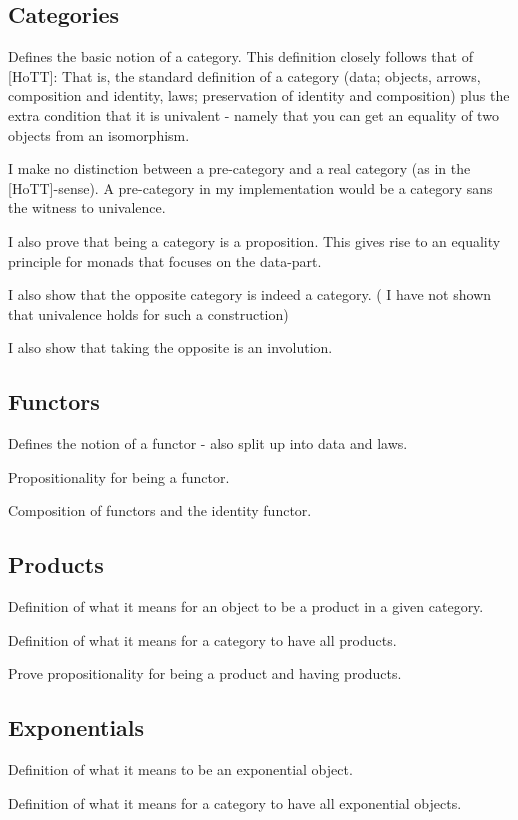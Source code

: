 \subsection{Categories}
Defines the basic notion of a category. This definition closely follows that of
[HoTT]: That is, the standard definition of a category (data; objects, arrows,
composition and identity, laws; preservation of identity and composition) plus
the extra condition that it is univalent - namely that you can get an equality
of two objects from an isomorphism.

I make no distinction between a pre-category and a real category (as in the
[HoTT]-sense). A pre-category in my implementation would be a category sans the
witness to univalence.

I also prove that being a category is a proposition. This gives rise to an
equality principle for monads that focuses on the data-part.

I also show that the opposite category is indeed a category. (\WIP{} I have not
shown that univalence holds for such a construction)

I also show that taking the opposite is an involution.

\subsection{Functors}
Defines the notion of a functor - also split up into data and laws.

Propositionality for being a functor.

Composition of functors and the identity functor.

\subsection{Products}
Definition of what it means for an object to be a product in a given category.

Definition of what it means for a category to have all products.

\WIP{} Prove propositionality for being a product and having products.

\subsection{Exponentials}
Definition of what it means to be an exponential object.

Definition of what it means for a category to have all exponential objects.

